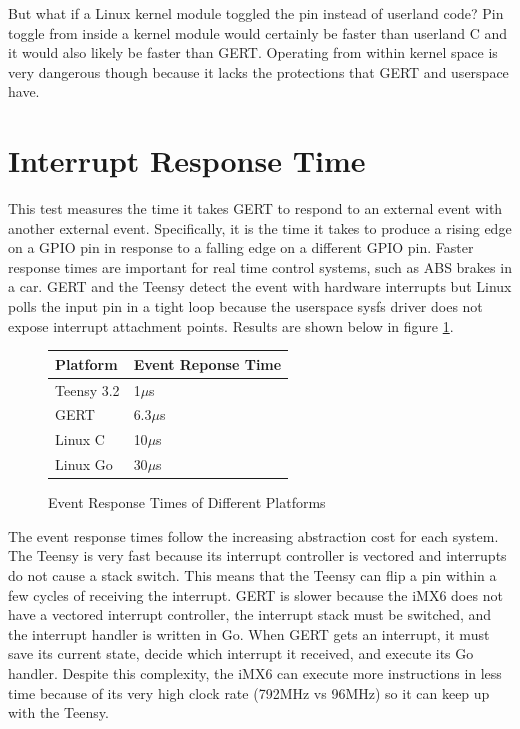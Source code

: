 But what if a Linux kernel module toggled the pin instead of userland code?
Pin toggle from inside a kernel module would certainly be faster than userland
C and it would also likely be faster than GERT. Operating from within
kernel space is very dangerous though because it lacks the protections that
GERT and userspace have.

\section{Interrupt Response Time}\label{sec:int_time}
This test measures the time it takes GERT to respond to an external event
with another external event. Specifically, it is the time it takes to produce
a rising edge on a GPIO pin in response to a falling edge on a different GPIO pin.
Faster response times are important for real time control systems, such as ABS brakes
in a car.
GERT and the Teensy detect the event with hardware interrupts
but Linux polls the input pin in a tight loop because the userspace sysfs
driver does not expose interrupt attachment points.
Results are shown below in figure \ref{fig:RT}.

\begin{figure} [h]
\begin{center}
  \begin{tabular}{ | l | l |}
    \hline
    Platform & Event Reponse Time \\ \hline
    Teensy 3.2 & 1$\mu$s \\ \hline
    GERT & 6.3$\mu$s \\ \hline
    Linux C & 10$\mu$s \\ \hline
    Linux Go & 30$\mu$s \\
    \hline
  \end{tabular}
\end{center}
  \caption{Event Response Times of Different Platforms}  \label{fig:RT}
\end{figure}

The event response times follow the increasing abstraction cost for each system.
The Teensy is very fast because its interrupt controller is vectored and interrupts
do not cause a stack switch. This means that the Teensy can flip a pin within a few cycles
of receiving the interrupt. GERT is slower because the iMX6 does not have a
vectored interrupt controller, the interrupt stack must be switched, and the
interrupt handler is written in Go. When GERT gets an interrupt, it must save its
current state, decide which interrupt it received, and execute its Go handler. Despite this
complexity, the iMX6 can execute more instructions in less time because of its very
high clock rate (792MHz vs 96MHz) so it can keep up with the Teensy.

